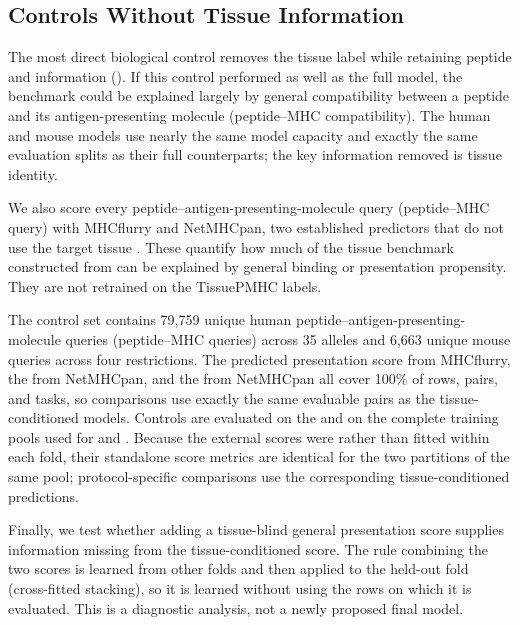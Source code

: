 \subsection{Controls Without Tissue Information}

The most direct biological control removes the tissue label while retaining peptide and \plainMHC{} information (\plainMHCOnly{}). If this control performed as well as the full model, the benchmark could be explained largely by general compatibility between a peptide and its antigen-presenting molecule (peptide--MHC compatibility). The human and mouse \plainMHCOnly{} models use nearly the same model capacity and exactly the same evaluation splits as their full counterparts; the key information removed is tissue identity.

We also score every peptide--antigen-presenting-molecule query (peptide--MHC query) with MHCflurry and NetMHCpan, two established predictors that do not use the target tissue \cite{odonnell2020mhcflurry,reynisson2020netmhcpan}. These \plainGeneralPMHC{} quantify how much of the tissue benchmark constructed from \plainMatchedPairs{} can be explained by general binding or presentation propensity. They are not retrained on the TissuePMHC labels.

The control set contains 79,759 unique human peptide--antigen-presenting-molecule queries (peptide--MHC queries) across 35 \plainHLA{} alleles and 6,663 unique mouse queries across four \plainHtwo{} restrictions. The predicted presentation score from MHCflurry, the \plainEL{} from NetMHCpan, and the \plainBA{} from NetMHCpan all cover 100\% of rows, pairs, and tasks, so comparisons use exactly the same evaluable pairs as the tissue-conditioned models. Controls are evaluated on the \plainFixedTest{} and on the complete training pools used for \plainMatchedOOF{} and \plainPeptideOOF{}. Because the external scores were \plainFrozen{} rather than fitted within each fold, their standalone score metrics are identical for the two \plainOOF{} partitions of the same pool; protocol-specific comparisons use the corresponding tissue-conditioned \plainOOF{} predictions.

Finally, we test whether adding a tissue-blind general presentation score supplies information missing from the tissue-conditioned score. The rule combining the two scores is learned from other folds and then applied to the held-out fold (cross-fitted stacking), so it is learned without using the rows on which it is evaluated. This is a diagnostic analysis, not a newly proposed final model.


